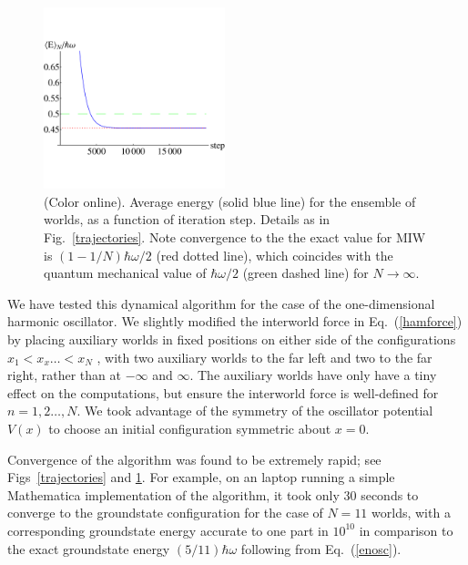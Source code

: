 \documentclass[twocolumn,aps,pra,amsmath,amssymb,superscriptaddress]{revtex4}
\renewcommand{\(}{\left(}
\renewcommand{\)}{\right)}
\newcommand{\blk}{\color{black}}
\begin{document}
    \begin{figure}[!t]
	\includegraphics[width=0.47\textwidth]{groundstate-energy.pdf}
    \caption{\label{algorithm} (Color online).
 Average energy (solid blue line) for the ensemble of worlds, 
 as a function of iteration step. Details as in Fig.~\ref{trajectories}. 
       Note convergence to the the exact value for MIW is
        $(1-1/N)\hbar\omega/2$ (red \blk dotted line),  which coincides with 
        the quantum mechanical value of $\hbar\omega/2$ (green \blk dashed line) for $N\to \infty$.\blk}
\end{figure}

We have tested this dynamical algorithm \blk for the case of the one-dimensional
harmonic oscillator.  We slightly \blk modified \blk the interworld force in Eq.~(\ref{hamforce}) by
placing auxiliary worlds in fixed positions on either side of the configurations
$x_1<x_x\dots <x_N$ , with two auxiliary worlds to the far left and two to the
far right, rather than at $-\infty$ and $\infty$.  The auxiliary worlds have
only have a tiny effect on the computations, but ensure the interworld force is
well-defined for $n=1,2\dots,N$.   We took advantage of the symmetry of the
oscillator potential $V(x)$ to choose an initial configuration symmetric about
$x=0$.

Convergence of the algorithm was found to be extremely rapid; see 
Figs~\ref{trajectories} and \ref{algorithm}. \blk  For example, on
an laptop running a simple Mathematica implementation of the algorithm, it took
only 30 seconds to converge to the groundstate configuration for the case of
$N=11$ worlds,  with a corresponding groundstate energy accurate to one part in
 $10^{10}$ \blk in comparison to the exact groundstate energy $(5/11)\hbar\omega$
following from Eq.~(\ref{enosc}).  
\end{document}
